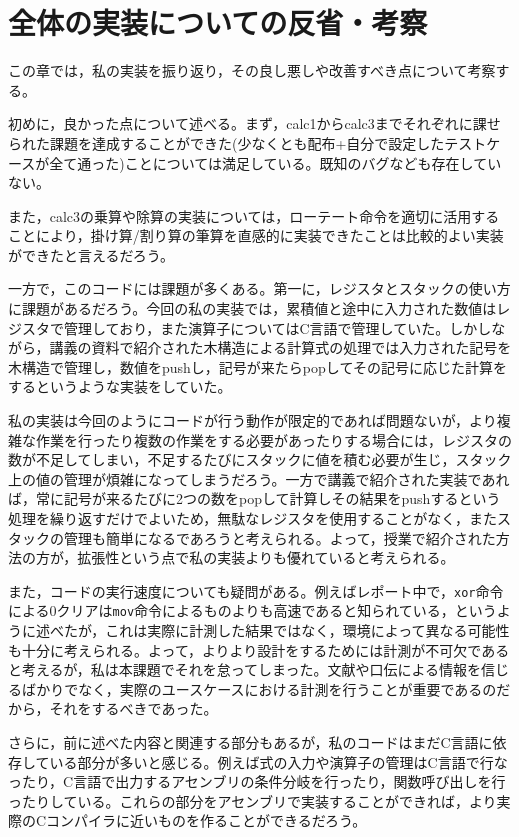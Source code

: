 \documentclass[a4paper]{jsarticle}
\newcommand{\var}[1]{\texttt{#1}}
\begin{document}
\section{全体の実装についての反省・考察}
この章では，私の実装を振り返り，その良し悪しや改善すべき点について考察する。

初めに，良かった点について述べる。まず，calc1からcalc3までそれぞれに課せられた課題を達成することができた(少なくとも配布+自分で設定したテストケースが全て通った)ことについては満足している。既知のバグなども存在していない。

また，calc3の乗算や除算の実装については，ローテート命令を適切に活用することにより，掛け算/割り算の筆算を直感的に実装できたことは比較的よい実装ができたと言えるだろう。

一方で，このコードには課題が多くある。第一に，レジスタとスタックの使い方に課題があるだろう。今回の私の実装では，累積値と途中に入力された数値はレジスタで管理しており，また演算子についてはC言語で管理していた。しかしながら，講義の資料で紹介された木構造による計算式の処理では入力された記号を木構造で管理し，数値をpushし，記号が来たらpopしてその記号に応じた計算をするというような実装をしていた。

私の実装は今回のようにコードが行う動作が限定的であれば問題ないが，より複雑な作業を行ったり複数の作業をする必要があったりする場合には，レジスタの数が不足してしまい，不足するたびにスタックに値を積む必要が生じ，スタック上の値の管理が煩雑になってしまうだろう。一方で講義で紹介された実装であれば，常に記号が来るたびに2つの数をpopして計算しその結果をpushするという処理を繰り返すだけでよいため，無駄なレジスタを使用することがなく，またスタックの管理も簡単になるであろうと考えられる。よって，授業で紹介された方法の方が，拡張性という点で私の実装よりも優れていると考えられる。

また，コードの実行速度についても疑問がある。例えばレポート中で，\var{xor}命令による0クリアは\var{mov}命令によるものよりも高速であると知られている，というように述べたが，これは実際に計測した結果ではなく，環境によって異なる可能性も十分に考えられる。よって，よりより設計をするためには計測が不可欠であると考えるが，私は本課題でそれを怠ってしまった。文献や口伝による情報を信じるばかりでなく，実際のユースケースにおける計測を行うことが重要であるのだから，それをするべきであった。

さらに，前に述べた内容と関連する部分もあるが，私のコードはまだC言語に依存している部分が多いと感じる。例えば式の入力や演算子の管理はC言語で行なったり，C言語で出力するアセンブリの条件分岐を行ったり，関数呼び出しを行ったりしている。これらの部分をアセンブリで実装することができれば，より実際のCコンパイラに近いものを作ることができるだろう。
\end{document}
